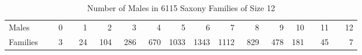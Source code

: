 \begin{table}[htb]
 \caption{Number of Males in 6115 Saxony Families of Size 12}\label{tab:saxdata}
 \begin{center}
 \begin{tabular}{lrrrrrrrrrrrrr}
  \hline
  Males & 0 & 1 & 2 & 3 & 4 & 5 & 6 & 7 & 8 & 9 & 10 & 11 & 12 \\ 
  Families & ~~~3 & ~~24 & ~104 & ~286 & ~670 & 1033 & 1343 & 1112 & ~829 & ~478 & 181 & ~~45 & ~~~7 \\ 
  \hline
 \end{tabular}
 \end{center}
\end{table}
